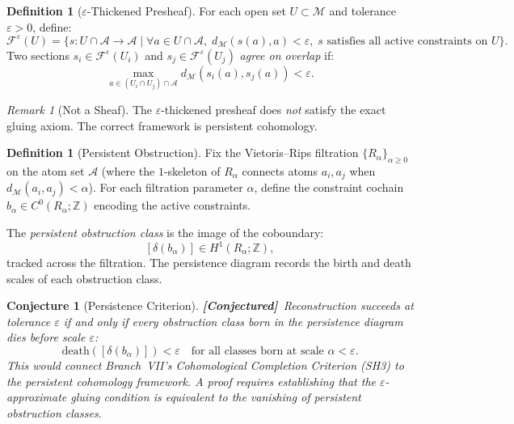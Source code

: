 \documentclass[11pt,a4paper]{article}
\newtheorem{conjecture}[theorem]{Conjecture}
\theoremstyle{definition}
\newtheorem{definition}[theorem]{Definition}
\theoremstyle{remark}
\newtheorem{remark}[theorem]{Remark}
\newcommand{\sheaf}{\mathcal{F}}
\newcommand{\Z}{\mathbb{Z}}
\newcommand{\statusconjecture}{\textcolor{orange!80!black}{\textbf{[Conjectured]}}}
\begin{document}
\begin{definition}[$\varepsilon$-Thickened Presheaf]\label{def:thick_presheaf}
For each open set $U \subset \mathcal{M}$ and tolerance 
$\varepsilon > 0$, define:
\begin{equation}\label{eq:thick_presheaf}
    \sheaf^\varepsilon(U) = \{s : U \cap \mathcal{A} \to 
    \mathcal{A} \mid 
    \forall a \in U \cap \mathcal{A},\; 
    d_{\mathcal{M}}(s(a), a) < \varepsilon,\; 
    s \text{ satisfies all active constraints on } U\}.
\end{equation}
Two sections $s_i \in \sheaf^\varepsilon(U_i)$ and 
$s_j \in \sheaf^\varepsilon(U_j)$ \emph{agree on overlap} if:
\begin{equation}\label{eq:approx_agree}
    \max_{a \in (U_i \cap U_j) \cap \mathcal{A}} 
    d_{\mathcal{M}}(s_i(a), s_j(a)) < \varepsilon.
\end{equation}
\end{definition}

\begin{remark}[Not a Sheaf]\label{rem:not_sheaf}
The $\varepsilon$-thickened presheaf does \emph{not} satisfy the 
exact gluing axiom. The correct framework is persistent cohomology.
\end{remark}


\begin{definition}[Persistent Obstruction]\label{def:persistent_obs}
Fix the Vietoris--Rips filtration $\{R_\alpha\}_{\alpha \geq 0}$ 
on the atom set $\mathcal{A}$ (where the $1$-skeleton of $R_\alpha$ 
connects atoms $a_i, a_j$ when 
$d_{\mathcal{M}}(a_i, a_j) < \alpha$). For each filtration 
parameter $\alpha$, define the constraint cochain 
$b_\alpha \in C^0(R_\alpha; \Z)$ encoding the active constraints.

The \emph{persistent obstruction class} is the image of the 
coboundary:
\begin{equation}\label{eq:persistent_obs}
    [\delta(b_\alpha)] \in H^1(R_\alpha; \Z),
\end{equation}
tracked across the filtration. The persistence diagram records 
the birth and death scales of each obstruction class.
\end{definition}

\begin{conjecture}[Persistence Criterion]\label{conj:persistence}
\statusconjecture\ Reconstruction succeeds at tolerance 
$\varepsilon$ if and only if every obstruction class born in 
the persistence diagram dies before scale $\varepsilon$:
\begin{equation}\label{eq:persistence_criterion}
    \mathrm{death}([\delta(b_\alpha)]) < \varepsilon
    \quad \text{for all classes born at scale } \alpha < \varepsilon.
\end{equation}
This would connect Branch~VII's Cohomological Completion 
Criterion (SH3) to the persistent cohomology framework. 
A proof requires establishing that the $\varepsilon$-approximate 
gluing condition is equivalent to the vanishing of persistent 
obstruction classes.
\end{conjecture}
\end{document}
